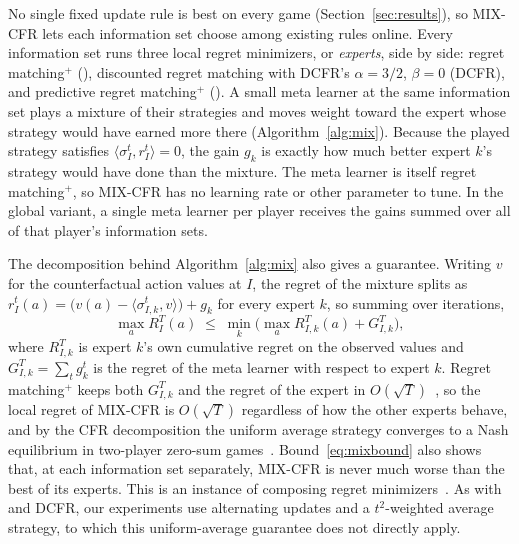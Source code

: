 No single fixed update rule is best on every game (Section~\ref{sec:results}), so MIX-CFR lets
each information set choose among existing rules online. Every information set runs three local
regret minimizers, or \emph{experts}, side by side: regret matching$^+$ (\cfrp{}), discounted
regret matching with DCFR's $\alpha=3/2$, $\beta=0$ (DCFR), and predictive regret
matching$^+$ (\pcfrp{}). A small meta learner at the same information set plays a mixture of
their strategies and moves weight toward the expert whose strategy would have earned more there
(Algorithm~\ref{alg:mix}). Because the played strategy satisfies
$\langle\sigma^t_I, r^t_I\rangle = 0$, the gain $g_k$ is exactly how much better expert $k$'s
strategy would have done than the mixture. The meta learner is itself regret
matching$^+$, so MIX-CFR has no learning rate or other parameter to tune. In the global
variant, a single meta learner per player receives the gains summed over all of that player's
information sets.

The decomposition behind Algorithm~\ref{alg:mix} also gives a guarantee. Writing $v$ for the
counterfactual action values at $I$, the regret of the mixture splits as
$r^t_I(a) = \big(v(a) - \langle\sigma^t_{I,k}, v\rangle\big) + g_k$ for every expert $k$, so
summing over iterations,
\begin{equation}
  \max_a R^T_I(a) \;\le\; \min_k \Big( \max_a R^T_{I,k}(a) + G^T_{I,k} \Big),
  \label{eq:mixbound}
\end{equation}
where $R^T_{I,k}$ is expert $k$'s own cumulative regret on the observed values and
$G^T_{I,k} = \sum_t g^t_k$ is the regret of the meta learner with respect to expert $k$. Regret
matching$^+$ keeps both $G^T_{I,k}$ and the regret of the \cfrp{} expert in
$O(\sqrt{T})$~\cite{tammelin2015solving}, so the local regret of MIX-CFR is $O(\sqrt{T})$
regardless of how the other experts behave, and by the CFR decomposition the uniform average
strategy converges to a Nash equilibrium in two-player zero-sum
games~\cite{zinkevich2007regret}. Bound~\eqref{eq:mixbound} also shows that, at each information
set separately, MIX-CFR is never much worse than the best of its experts. This is an instance of
composing regret minimizers~\cite{farina2019regret}. As with \pcfrp{} and DCFR, our experiments
use alternating updates and a $t^2$-weighted average strategy, to which this uniform-average
guarantee does not directly apply.

